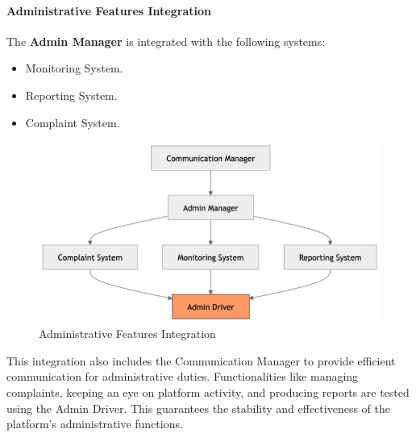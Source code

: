 \paragraph{Administrative Features Integration}
The \textbf{Admin Manager} is integrated with the following systems:
\begin{itemize}
    \item Monitoring System.
    \item Reporting System.
    \item Complaint System.
\end{itemize}
\begin{figure}[H]
    \begin{center}
      \includegraphics[width=0.59\linewidth]{JhaBhatiaSharma/imagesDD/AdministrativeFeaturesIntegration.png}
        \caption{Administrative Features Integration}
        \label{fig:adminstrativefeatures}
    \end{center}
\end{figure}
This integration also includes the Communication Manager to provide efficient communication for administrative duties. Functionalities like managing complaints, keeping an eye on platform activity, and producing reports are tested using the Admin Driver. This guarantees the stability and effectiveness of the platform's administrative functions.



